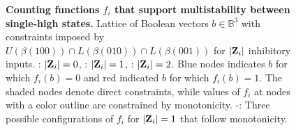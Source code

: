 \documentclass[12pt]{amsart}
\newcommand{\bZ}{{\bf Z}}
\newcommand{\bbB}{\mathbb{B}}
\theoremstyle{definition}
\begin{document}
\begin{figure}[ht]
\begin{subfigure}{0.3\textwidth}
        \caption{}
        \label{fig:B3latk1_2}
    \end{subfigure}
  
    \caption{\textbf{Counting functions $f_i$ that support multistability between single-high states.} Lattice of Boolean vectors $b\in \bbB^3$ with constraints imposed by $U(\beta(100)) \cap L(\beta(010)) \cap L(\beta(001))$ for $|\bZ_i|$ inhibitory inputs. : $|\bZ_i|=0$, : $|\bZ_i|=1$, : $|\bZ_i|=2$. Blue nodes indicates $b$ for which $f_i(b)=0$ and red indicated $b$ for which $f_i(b) =1$. The shaded nodes denote direct constraints, while values of $f_i$ at nodes with a color outline are constrained by monotonicity. -: Three possible configurations of $f_i$ for $|\bZ_i|=1$ that follow monotonicity.}
\end{figure}
\end{document}
